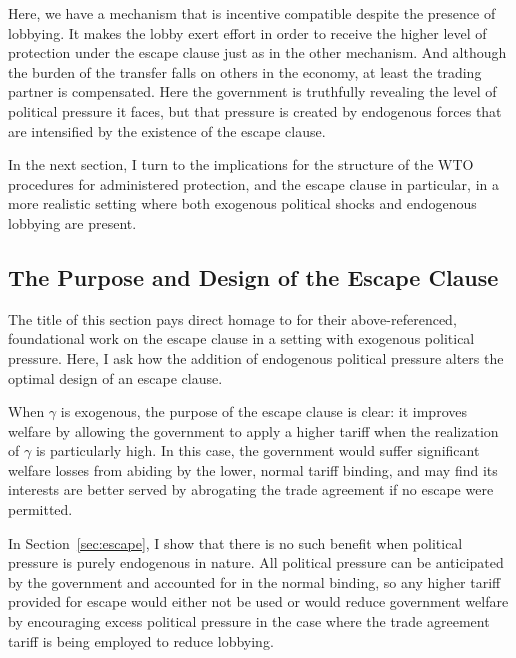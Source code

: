 \documentclass[12pt]{article}
\newcommand{\ga}{\gamma}
\begin{document}

Here, we have a mechanism that is incentive compatible despite the presence of lobbying. It makes the lobby exert effort in order to receive the higher level of protection under the escape clause just as in the other mechanism. And although the burden of the transfer falls on others in the economy, at least the trading partner is compensated. Here the government is truthfully revealing the level of political pressure it faces, but that pressure is created by endogenous forces that are intensified by the existence of the escape clause.

In the next section, I turn to the implications for the structure of the WTO procedures for administered protection, and the escape clause in particular, in a more realistic setting where both exogenous political shocks and endogenous lobbying are present.


\subsection{The Purpose and Design of the Escape Clause}
\label{sec:escape2}
The title of this section pays direct homage to \Textcite{bs2005} for their above-referenced, foundational work on the escape clause in a setting with exogenous political pressure. Here, I ask how the addition of endogenous political pressure alters the optimal design of an escape clause.

When $\ga$ is exogenous, the purpose of the escape clause is clear: it improves welfare by allowing the government to apply a higher tariff when the realization of $\ga$ is particularly high. In this case, the government would suffer significant welfare losses from abiding by the lower, normal tariff binding, and may find its interests are better served by abrogating the trade agreement if no escape were permitted.

In Section~\ref{sec:escape}, I show that there is no such benefit when political pressure is purely endogenous in nature. All political pressure can be anticipated by the government and accounted for in the normal binding, so any higher tariff provided for escape would either not be used or would reduce government welfare by encouraging excess political pressure in the case where the trade agreement tariff is being employed to reduce lobbying.
\end{document}
